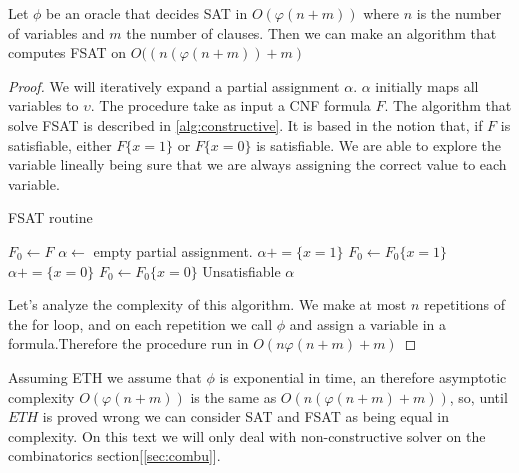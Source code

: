   \begin{proposition}
    Let $\phi$ be an oracle that decides SAT in $O(\varphi(n+m))$ where $n$ is the number of variables and $m$ the number of clauses. Then we can make an algorithm  that computes FSAT on $O((n(\varphi(n+m))+m)$ 
  \end{proposition}
  \begin{proof}
    We will iteratively expand a partial assignment $\alpha$. $\alpha$ initially maps all variables to $\upsilon$. The procedure take as input a CNF formula $F$. The algorithm that solve FSAT is described in \ref{alg:constructive}. It is based in the notion that, if  $F$ is satisfiable, either $F\{x=1\}$ or $F\{x=0\}$ is satisfiable. We are able to explore the variable lineally being sure that we are always assigning the correct value to each variable. 

    
    \begin{algorithm}
  \caption{FSAT routine}\label{alg:constructive}
  \begin{algorithmic}[1]

    
  \State $F_0 \gets F$
  \State $\alpha \gets$ empty partial assignment.
  \State
    \State $\alpha += \{x = 1\}$
    \State $F_0 \gets F_0\{x=1\}$
    \Else {} 
    \State $\alpha += \{x = 0\}$
    \State $F_0 \gets F_0\{x=0\}$
    \Else
    \State \Retun Unsatisfiable
    \EndIf
    \EndIf
    \EndFor
    \State \Return $\alpha$
  \end{algorithmic}
\end{algorithm}

Let's analyze the complexity of this algorithm. We make at most $n$ repetitions of the for loop, and on each repetition we call $\phi$ and assign a variable in a formula.Therefore the procedure run in $O(n\varphi(n+m)+m)$
\end{proof}

Assuming ETH we assume that $\phi$ is exponential in time, an therefore asymptotic complexity $O(\varphi(n+m))$ is the same as $O(n(\varphi(n+m)+m))$, so, until $ETH$ is proved wrong we can consider SAT and FSAT as being equal in complexity. On this text we will only deal with non-constructive  solver on the combinatorics section[\ref{sec:combu}].



